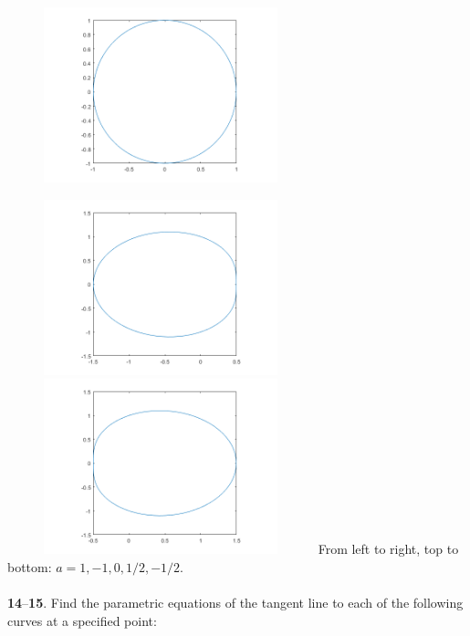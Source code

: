 \documentclass[12pt]{amsbook}
\begin{document}
\begin{center}
\includegraphics[width=3.5in,height=2.0in]{2_11_13_3.png}
\end{center}
\includegraphics[width=3.5in,height=2.0in]{2_11_13_2.png}
\includegraphics[width=3.5in,height=2.0in]{2_11_13_4.png}
From left to right, top to bottom: $a=1,-1,0,1/2,-1/2$.
\\
\\
\noindent
{\small {\bf 14}--{\bf 15}}. Find the parametric equations of the tangent line to each of the
following curves at a specified point:
\end{document}
